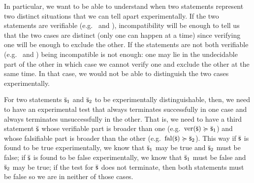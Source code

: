 	In particular, we want to be able to understand when two statements represent two distinct situations that we can tell apart experimentally. If the two statements are verifiable (e.g.~ and ), incompatibility will be enough to tell us that the two cases are distinct (only one can happen at a time) since verifying one will be enough to exclude the other. If the statements are not both verifiable (e.g.~ and ) being incompatible is not enough: one may lie in the undecidable part of the other in which case we cannot verify one and exclude the other at the same time. In that case, we would not be able to distinguish the two cases experimentally.
	
	For two statements $\bar{\mathsf{s}}_1$ and $\bar{\mathsf{s}}_2$ to be experimentally distinguishable, then, we need to have an experimental test that always terminates successfully in one case and always terminates unsuccessfully in the other. That is, we need to have a third statement $\bar{\mathsf{s}}$ whose verifiable part is broader than one (e.g.~$\operatorname{ver}(\bar{\mathsf{s}}) \succcurlyeq \bar{\mathsf{s}}_1$) and whose falsifiable part is broader than the other (e.g.~$\operatorname{fal}(\bar{\mathsf{s}}) \succcurlyeq \bar{\mathsf{s}}_2$). This way if $\bar{\mathsf{s}}$ is found to be true experimentally, we know that $\bar{\mathsf{s}}_1$ may be true and $\bar{\mathsf{s}}_2$ must be false; if $\bar{\mathsf{s}}$ is found to be false experimentally, we know that $\bar{\mathsf{s}}_1$ must be false and $\bar{\mathsf{s}}_2$ may be true; if the test for $\bar{\mathsf{s}}$ does not terminate, then both statements must be false so we are in neither of those cases.
	
	
